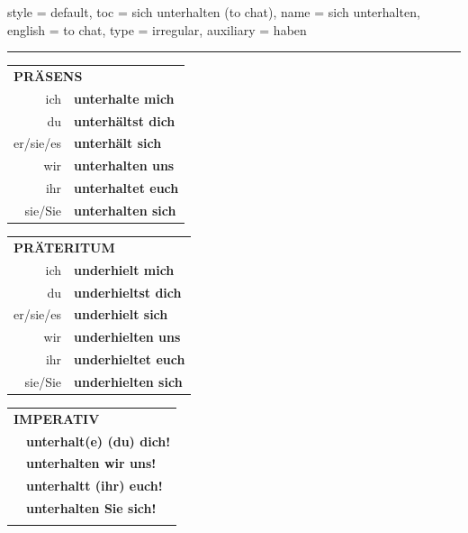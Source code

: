 \begin{verbentry}{
  style = {default},
  toc = {sich unterhalten (to chat)},
  name = {sich unterhalten},
  english = {to chat},
  type = {irregular},
  auxiliary = {haben}
}
 
    
       \vspace{5pt}

    \hrule
    
    \vspace{5pt}

  \begin{tabular}{rl}
     \multicolumn{2}{l}{\textbf{PRÄSENS} }\\
    ich & \textbf{unterhalte mich}\\
    du & \textbf{unterhältst dich}\\
    er/sie/es & \textbf{unterhält sich}\\
    wir & \textbf{unterhalten uns}\\
    ihr & \textbf{unterhaltet euch}\\
    sie/Sie & \textbf{unterhalten sich}\\
  \end{tabular}
  \hfill
     \begin{tabular}{rl}
    \multicolumn{2}{l}{\textbf{PRÄTERITUM} }\\
    ich & \textbf{underhielt mich}\\
    du & \textbf{underhieltst dich}\\
    er/sie/es & \textbf{underhielt sich}\\
    wir & \textbf{underhielten uns}\\
    ihr & \textbf{underhieltet euch}\\
    sie/Sie & \textbf{underhielten sich}\\
  \end{tabular}
  \hfill
  \begin{tabular}{rl}
     \multicolumn{2}{l}{\textbf{IMPERATIV} }\\
   & \textbf{unterhalt(e) (du) dich!}\\
   & \textbf{unterhalten wir uns!}\\
   & \textbf{unterhaltt (ihr) euch!}\\
   & \textbf{unterhalten Sie sich!}\\
   & \vspace{10pt}
  \end{tabular}

    \vspace{10pt}


\end{verbentry}
